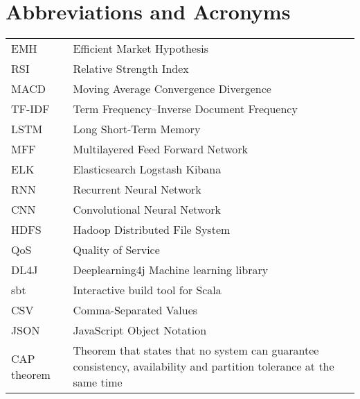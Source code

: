 \chapter*{Abbreviations and Acronyms}


\noindent
\begin{longtable}{@{}p{}p{}@{}}
EMH & Efficient Market Hypothesis \\
RSI & Relative Strength Index \\
MACD & Moving Average Convergence Divergence \\
TF-IDF & Term Frequency–Inverse Document Frequency \\
LSTM & Long Short-Term Memory \\
MFF & Multilayered Feed Forward Network \\
ELK & Elasticsearch Logstash Kibana \\
RNN & Recurrent Neural Network \\
CNN & Convolutional Neural Network \\
HDFS & Hadoop Distributed File System \\
QoS & Quality of Service \\
DL4J & Deeplearning4j Machine learning library \\
sbt & Interactive build tool for Scala \\
CSV & Comma-Separated Values \\
JSON & JavaScript Object Notation \\
CAP theorem & Theorem that states that no system can guarantee consistency, availability and partition tolerance at the same time \\

\end{longtable}
